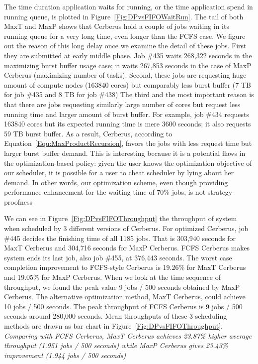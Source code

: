 The time duration application waits for running,
or the time application spend in running queue,
is plotted in Figure~\ref{Fig:DPvsFIFOWaitRun}.
The tail of both MaxT and MaxP shows that Cerberus hold a couple of jobs waiting
in its running queue for a very long time,
even longer than the FCFS case.
We figure out the reason of this long delay once we examine the detail of these jobs.
First they are submitted at early middle phase.
Job \#435 waits 268,322 seconds in the maximizing burst buffer usage case;
it waits 267,853 seconds in the case of MaxP Cerberus (maximizing number of tasks).
Second, these jobs are requesting huge amount of compute nodes (163840 cores)
but comparably less burst buffer (7 TB for job \#435 and 8 TB for job \#438)
The third and the most important reason is that there are jobs requesting similarly
large number of cores but request less running time and larger amount of burst buffer.
For example, job \#434 requests 163840 cores
but its expected running time is mere 3600 seconds;
it also requests 59 TB burst buffer.
As a result, Cerberus, according to Equation~\ref{Equ:MaxProductRecursion},
favors the jobs with less request time but larger burst buffer demand.
This is interesting because it is a potential flaws in the optimization-based policy:
given the user knows the optimization objective of our scheduler,
it is possible for a user to cheat scheduler by lying about her demand.
In other words, our optimization scheme, even though providing performance enhancement
for the waiting time of 70\% jobs, is not strategy-proofness\cite{Ghodsi:NSDI:2011}


We can see in Figure~\ref{Fig:DPvsFIFOThroughput} the throughput of system
when scheduled by 3 different versions of Cerberus.
For optimized Cerberus, job \#445 decides the finishing time of all 1185 jobs.
That is 303,940 seconds for MaxT Cerberus and 304,716 seconds for MaxP Cerberus.
FCFS Cerberus makes system ends its last job, also job \#455, at 376,443 seconds.
The worst case completion improvement to FCFS-style Cerberus is
19.26\% for MaxT Cerberus and 19.05\% for MaxP Cerberus.
When we look at the time sequence of throughput,
we found the peak value 9 jobs / 500 seconds obtained by MaxP Cerberus.
The alternative optimization method, MaxT Cerberus,
could achieve 10 jobs / 500 seconds.
The peak throughput of FCFS Cerberus is 9 jobs / 500 seconds around 280,000 seconds.
Mean throughputs of these 3 scheduling methods are drawn
as bar chart in Figure~\ref{Fig:DPvsFIFOThroughput}.
\textit{Comparing with FCFS Cerberus, MaxT Cerberus achieves
23.87\% higher average throughput (1.951 jobs / 500 seconds)
while MaxP Cerberus gives 23.43\% improvement (1.944 jobs / 500 seconds)}


